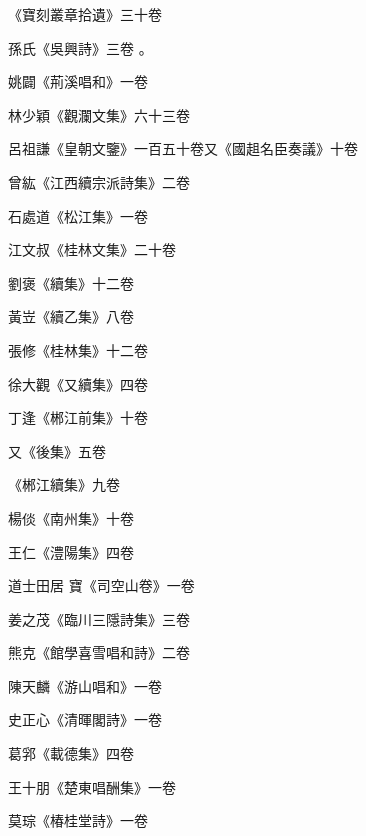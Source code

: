 \begin{pinyinscope}
 《寶刻叢章拾遺》三十卷


孫氏《吳興詩》三卷
 。



 姚闢《荊溪唱和》一卷



 林少穎《觀瀾文集》六十三卷



 呂祖謙《皇朝文鑒》一百五十卷又《國趄名臣奏議》十卷



 曾紘《江西續宗派詩集》二卷



 石處道《松江集》一卷



 江文叔《桂林文集》二十卷



 劉褒《續集》十二卷



 黃岦《續乙集》八卷



 張修《桂林集》十二卷



 徐大觀《又續集》四卷



 丁逢《郴江前集》十卷



 又《後集》五卷



 《郴江續集》九卷



 楊倓《南州集》十卷



 王仁《澧陽集》四卷



 道士田居
 寶《司空山卷》一卷



 姜之茂《臨川三隱詩集》三卷



 熊克《館學喜雪唱和詩》二卷



 陳天麟《游山唱和》一卷



 史正心《清暉閣詩》一卷



 葛郛《載德集》四卷



 王十朋《楚東唱酬集》一卷



 莫琮《椿桂堂詩》一卷




\end{pinyinscope}
